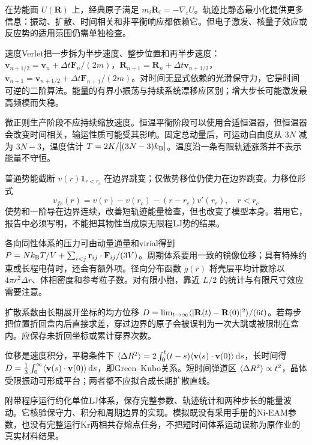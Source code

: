 \label{chap:md}
在势能面 $U(\mathbf R)$ 上，经典原子满足 $m_i\ddot{\mathbf R}_i=-\nabla_iU$。轨迹比静态最小化提供更多信息：振动、扩散、时间相关和非平衡响应都依赖它。但电子激发、核量子效应或反应势的适用范围仍需单独检查。

速度Verlet把一步拆为半步速度、整步位置和再半步速度：$\mathbf v_{n+1/2}=\mathbf v_n+\Delta t\mathbf F_n/(2m)$，$\mathbf R_{n+1}=\mathbf R_n+\Delta t\mathbf v_{n+1/2}$，$\mathbf v_{n+1}=\mathbf v_{n+1/2}+\Delta t\mathbf F_{n+1}/(2m)$。对时间无显式依赖的光滑保守力，它是时间可逆的二阶算法。能量的有界小振荡与持续系统漂移应区别；增大步长可能激发最高频模而失稳。

微正则生产阶段不应持续缩放速度。恒温平衡阶段可以使用合适恒温器，但恒温器会改变时间相关，输运性质可能受其影响。固定总动量后，可运动自由度从 $3N$ 减为 $3N-3$，温度估计 $T=2K/[(3N-3)k_{\mathrm B}]$。温度沿一条有限轨迹涨落并不表示能量不守恒。

普通势能截断 $v(r)\mathbf1_{r<r_c}$ 在边界跳变；仅做势移位仍使力在边界跳变。力移位形式
\[
v_{fs}(r)=v(r)-v(r_c)-(r-r_c)v'(r_c),\quad r<r_c
\]
使势和一阶导在边界连续，改善短轨迹能量检查，但也改变了模型本身。若用它，报告中必须写明，不能把其物性当成原无限程LJ势的结果。

各向同性体系的压力可由动量通量和virial得到 $P=Nk_{\mathrm B} T/V+\sum_{i<j}\mathbf r_{ij}\cdot\mathbf F_{ij}/(3V)$。周期体系要用一致的镜像位移；具有特殊约束或长程电荷时，还会有额外项。径向分布函数 $g(r)$ 将壳层平均计数除以 $4\pi r^2\Delta r$、体相密度和参考粒子数。对有限小胞，靠近 $L/2$ 的统计与有限尺寸效应需要注意。

扩散系数由长期展开坐标的均方位移 $D=\lim_{t\to\infty}\langle |\mathbf R(t)-\mathbf R(0)|^2\rangle/(6t)$。若每步把位置折回盒内后直接求差，穿过边界的原子会被误判为一次大跳或被限制在盒内。应保存未折回坐标或累计穿界次数。

位移是速度积分，平稳条件下 $\langle \Delta R^2\rangle=2\int_0^t(t-s)\langle \mathbf v(s)\cdot\mathbf v(0)\rangle\,\mathrm d s$，长时间得 $D=\tfrac13\int_0^\infty\langle \mathbf v(s)\cdot\mathbf v(0)\rangle\,\mathrm d s$，即Green--Kubo关系。短时间弹道区 $\langle \Delta R^2\rangle\propto t^2$，晶体受限振动可形成平台；两者都不应拟合成长期扩散直线。

附带程序运行约化单位LJ体系，保存完整参数、轨迹统计和两种步长的能量波动。它核验保守力、积分和周期边界的实现。模拟既没有采用手册的Ni-EAM参数，也没有完整运行Kr两相共存熔点任务，不把短时间体系运动误称为原作业的真实材料结果。

